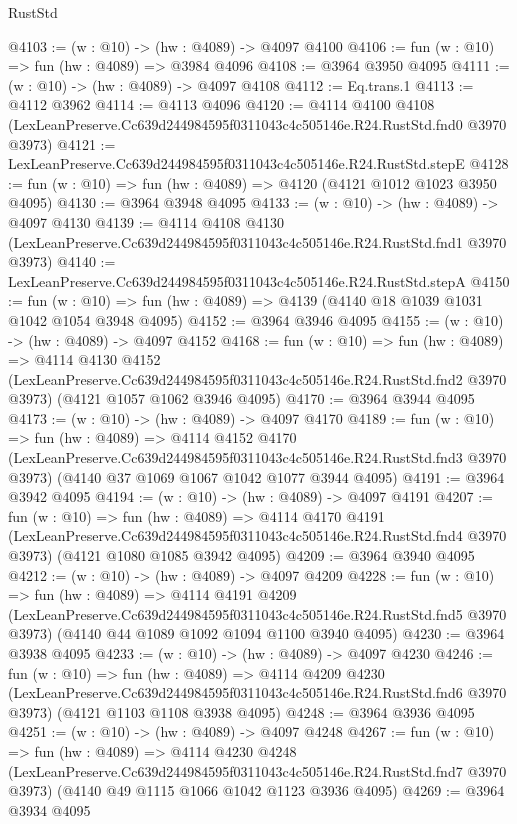 \begin{lexlean}{RustStd}
\begin{coremodule}
@4103 := (w : @10) -> (hw : @4089) -> @4097 @4100
@4106 := fun (w : @10) => fun (hw : @4089) => @3984 @4096
@4108 := @3964 @3950 @4095
@4111 := (w : @10) -> (hw : @4089) -> @4097 @4108
@4112 := Eq.trans.{1}
@4113 := @4112 @3962
@4114 := @4113 @4096
@4120 := @4114
    @4100
    @4108
    (LexLeanPreserve.Cc639d244984595f0311043c4c505146e.R24.RustStd.fnd0 @3970 @3973)
@4121 := LexLeanPreserve.Cc639d244984595f0311043c4c505146e.R24.RustStd.stepE
@4128 := fun (w : @10) => fun (hw : @4089) => @4120 (@4121 @1012 @1023 @3950 @4095)
@4130 := @3964 @3948 @4095
@4133 := (w : @10) -> (hw : @4089) -> @4097 @4130
@4139 := @4114
    @4108
    @4130
    (LexLeanPreserve.Cc639d244984595f0311043c4c505146e.R24.RustStd.fnd1 @3970 @3973)
@4140 := LexLeanPreserve.Cc639d244984595f0311043c4c505146e.R24.RustStd.stepA
@4150 := fun (w : @10) => fun (hw : @4089) => @4139 (@4140 @18 @1039 @1031 @1042 @1054 @3948 @4095)
@4152 := @3964 @3946 @4095
@4155 := (w : @10) -> (hw : @4089) -> @4097 @4152
@4168 := fun (w : @10) =>
  fun (hw : @4089) =>
  @4114
    @4130
    @4152
    (LexLeanPreserve.Cc639d244984595f0311043c4c505146e.R24.RustStd.fnd2 @3970 @3973)
    (@4121 @1057 @1062 @3946 @4095)
@4170 := @3964 @3944 @4095
@4173 := (w : @10) -> (hw : @4089) -> @4097 @4170
@4189 := fun (w : @10) =>
  fun (hw : @4089) =>
  @4114
    @4152
    @4170
    (LexLeanPreserve.Cc639d244984595f0311043c4c505146e.R24.RustStd.fnd3 @3970 @3973)
    (@4140 @37 @1069 @1067 @1042 @1077 @3944 @4095)
@4191 := @3964 @3942 @4095
@4194 := (w : @10) -> (hw : @4089) -> @4097 @4191
@4207 := fun (w : @10) =>
  fun (hw : @4089) =>
  @4114
    @4170
    @4191
    (LexLeanPreserve.Cc639d244984595f0311043c4c505146e.R24.RustStd.fnd4 @3970 @3973)
    (@4121 @1080 @1085 @3942 @4095)
@4209 := @3964 @3940 @4095
@4212 := (w : @10) -> (hw : @4089) -> @4097 @4209
@4228 := fun (w : @10) =>
  fun (hw : @4089) =>
  @4114
    @4191
    @4209
    (LexLeanPreserve.Cc639d244984595f0311043c4c505146e.R24.RustStd.fnd5 @3970 @3973)
    (@4140 @44 @1089 @1092 @1094 @1100 @3940 @4095)
@4230 := @3964 @3938 @4095
@4233 := (w : @10) -> (hw : @4089) -> @4097 @4230
@4246 := fun (w : @10) =>
  fun (hw : @4089) =>
  @4114
    @4209
    @4230
    (LexLeanPreserve.Cc639d244984595f0311043c4c505146e.R24.RustStd.fnd6 @3970 @3973)
    (@4121 @1103 @1108 @3938 @4095)
@4248 := @3964 @3936 @4095
@4251 := (w : @10) -> (hw : @4089) -> @4097 @4248
@4267 := fun (w : @10) =>
  fun (hw : @4089) =>
  @4114
    @4230
    @4248
    (LexLeanPreserve.Cc639d244984595f0311043c4c505146e.R24.RustStd.fnd7 @3970 @3973)
    (@4140 @49 @1115 @1066 @1042 @1123 @3936 @4095)
@4269 := @3964 @3934 @4095

\end{coremodule}
\end{lexlean}
